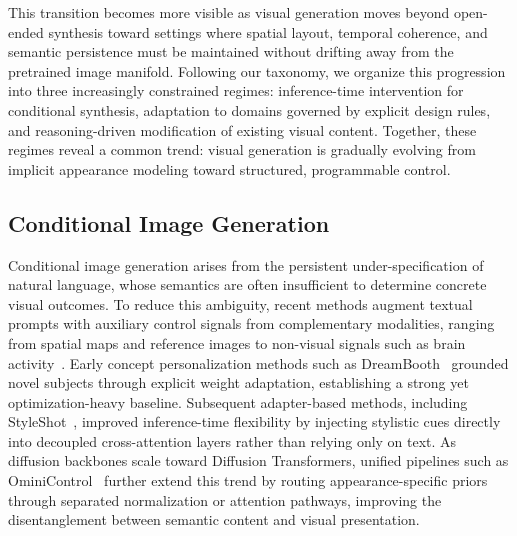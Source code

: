 This transition becomes more visible as visual generation moves beyond open-ended synthesis toward settings where spatial layout, temporal coherence, and semantic persistence must be maintained without drifting away from the pretrained image manifold. Following our taxonomy, we organize this progression into three increasingly constrained regimes: inference-time intervention for conditional synthesis, adaptation to domains governed by explicit design rules, and reasoning-driven modification of existing visual content. Together, these regimes reveal a common trend: visual generation is gradually evolving from implicit appearance modeling toward structured, programmable control.



\subsection{Conditional Image Generation}
\label{subsec:conditional_gen}

Conditional image generation arises from the persistent under-specification of natural language, whose semantics are often insufficient to determine concrete visual outcomes. To reduce this ambiguity, recent methods augment textual prompts with auxiliary control signals from complementary modalities, ranging from spatial maps and reference images to non-visual signals such as brain activity~\citep{wang2024mindbridge}. Early concept personalization methods such as DreamBooth~\citep{ruiz2023dreambooth} grounded novel subjects through explicit weight adaptation, establishing a strong yet optimization-heavy baseline. Subsequent adapter-based methods, including StyleShot~\citep{StyleShot}, improved inference-time flexibility by injecting stylistic cues directly into decoupled cross-attention layers rather than relying only on text. As diffusion backbones scale toward Diffusion Transformers, unified pipelines such as OminiControl~\citep{OminiControl} further extend this trend by routing appearance-specific priors through separated normalization or attention pathways, improving the disentanglement between semantic content and visual presentation.


